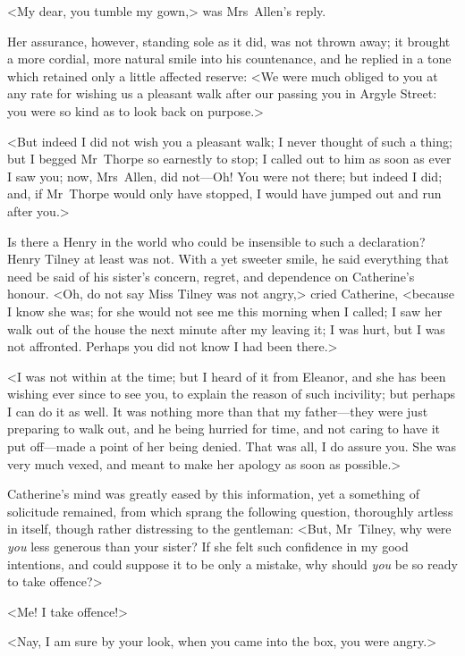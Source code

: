  <My dear, you tumble my gown,> was Mrs~Allen's reply. 

 Her assurance, however, standing sole as it did, was not thrown away; it brought a more cordial, more natural smile into his countenance, and he replied in a tone which retained only a little affected reserve: <We were much obliged to you at any rate for wishing us a pleasant walk after our passing you in Argyle Street: you were so kind as to look back on purpose.> 

 <But indeed I did not wish you a pleasant walk; I never thought of such a thing; but I begged Mr~Thorpe so earnestly to stop; I called out to him as soon as ever I saw you; now, Mrs~Allen, did not—Oh! You were not there; but indeed I did; and, if Mr~Thorpe would only have stopped, I would have jumped out and run after you.> 

 Is there a Henry in the world who could be insensible to such a declaration? Henry Tilney at least was not. With a yet sweeter smile, he said everything that need be said of his sister's concern, regret, and dependence on Catherine's honour. <Oh, do not say Miss Tilney was not angry,> cried Catherine, <because I know she was; for she would not see me this morning when I called; I saw her walk out of the house the next minute after my leaving it; I was hurt, but I was not affronted. Perhaps you did not know I had been there.> 

 <I was not within at the time; but I heard of it from Eleanor, and she has been wishing ever since to see you, to explain the reason of such incivility; but perhaps I can do it as well. It was nothing more than that my father—they were just preparing to walk out, and he being hurried for time, and not caring to have it put off—made a point of her being denied. That was all, I do assure you. She was very much vexed, and meant to make her apology as soon as possible.> 

 Catherine's mind was greatly eased by this information, yet a something of solicitude remained, from which sprang the following question, thoroughly artless in itself, though rather distressing to the gentleman: <But, Mr~Tilney, why were \textit{you} less generous than your sister? If she felt such confidence in my good intentions, and could suppose it to be only a mistake, why should \textit{you} be so ready to take offence?> 

 <Me! I take offence!> 

 <Nay, I am sure by your look, when you came into the box, you were angry.> 

